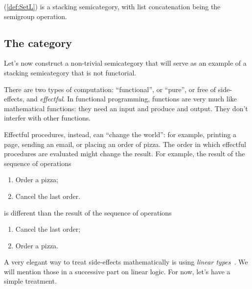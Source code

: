 \begin{example}
    \SetL (\cref{def:SetL}) is a stacking semicategory,
    with list concatenation being the semigroup operation.
    
\end{example}

\subsection{The \Effects category}

Let's now construct a non-trivial semicategory that will serve as an example of a stacking semicategory that is not functorial.

There are two types of computation: ``functional'', or ``pure'', or free of side-effects, and \emph{effectful}.
In functional programming, functions are very much like mathematical functions: they need an input and produce and output.
They don't interfer with other functions.

Effectful procedures,  instead, can ``change the world'': for example, printing a page, sending an email, or placing an order of pizza.
The order in which effectful procedures are evaluated might change the result.
For example, the result of the sequence of operations
%
\begin{enumerate}
    \item Order a pizza;
    \item Cancel the last order.
\end{enumerate}
%
is different than the result of the sequence of operations
%
\begin{enumerate}
    \item Cancel the last order;
    \item Order a pizza.
\end{enumerate}

A very elegant way to treat side-effects mathematically is using \emph{linear types}~\cite{Wadler90lineartypes}.
We will mention those in a successive part on linear logic.
For now, let's have a simple treatment.

\begin{marginfigure}
    \centering
    \\
    \caption{}
    \label{fig:effects12}
\end{marginfigure}


